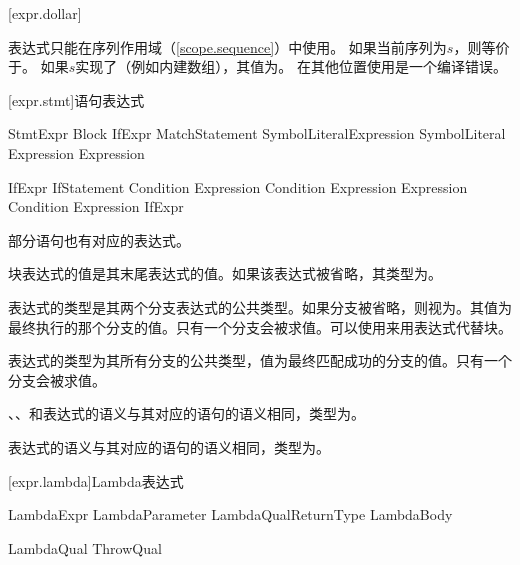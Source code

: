 [expr.dollar]{\tcode{\$}}

\pnum
表达式\tcode{\$}只能在序列作用域（\ref{scope.sequence}）中使用。
如果当前序列为$s$，则\tcode{\$}等价于。
如果$s$实现了（例如内建数组），其值为。
在其他位置使用\tcode{\$}是一个编译错误。

[expr.stmt]{语句表达式}

\begin{bnf}{StmtExpr}
    Block \br
    IfExpr \br
    MatchStatement \br
     SymbolLiteral\bnfq Expression\bnfq \br
     SymbolLiteral\bnfq \br
     Expression\bnfq \br
     Expression\bnfq
\end{bnf}

\begin{bnf}{IfExpr}
    IfStatement \br
     Condition  Expression \br
     Condition  Expression  Expression \br
     Condition  Expression  IfExpr
\end{bnf}

\pnum
部分语句也有对应的表达式。

\pnum
块表达式的值是其末尾表达式的值。如果该表达式被省略，其类型为。

\pnum
{}表达式的类型是其两个分支表达式的公共类型。如果分支被省略，则视为。其值为最终执行的那个分支的值。只有一个分支会被求值。可以使用来用表达式代替块。

\pnum
{}表达式的类型为其所有分支的公共类型，值为最终匹配成功的分支的值。只有一个分支会被求值。

\pnum
{}、、和表达式的语义与其对应的语句的语义相同，类型为。

\pnum
{}表达式的语义与其对应的语句的语义相同，类型为。

[expr.lambda]{Lambda表达式}

\begin{bnf}{LambdaExpr}
    LambdaParameter LambdaQual\bnfs ReturnType\bnfq \terminal{=>} LambdaBody
\end{bnf}

\begin{bnf}{LambdaQual}
     \br
    ThrowQual
\end{bnf}

